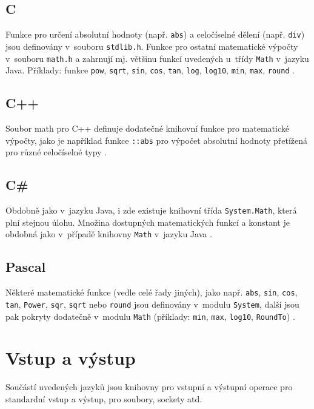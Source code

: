 \documentclass{bakalarka}
\begin{document}
\subsection{C}
Funkce pro určení absolutní hodnoty (např. \texttt{abs}) a celočíselné dělení (např. \texttt{div}) jsou definovány v~souboru \texttt{stdlib.h}. Funkce pro ostatní matematické výpočty v~souboru \texttt{math.h} a zahrnují mj. většinu funkcí uvedených u~třídy \texttt{Math} v~jazyku Java. Příklady: funkce \texttt{pow}, \texttt{sqrt}, \texttt{sin}, \texttt{cos}, \texttt{tan}, \texttt{log}, \texttt{log10}, \texttt{min}, \texttt{max}, \texttt{round} \cite{cpp-guide-cstdlib, cpp-guide-cmath}.

\subsection{C++}
Soubor math pro C++ definuje dodatečné knihovní funkce pro matematické výpočty, jako je například funkce \texttt{::abs} pro výpočet absolutní hodnoty přetížená pro různé celočíselné typy \cite{cpp-guide-cstdlib, cpp-guide-abs}.

\subsection{C\#}
Obdobně jako v~jazyku Java, i zde existuje knihovní třída \texttt{System.Math}, která plní stejnou úlohu. Množina dostupných matematických funkcí a konstant je obdobná jako v~případě knihovny \texttt{Math} v~jazyku Java \cite{cs-guide-math}.

\subsection{Pascal}
Některé matematické funkce (vedle celé řady jiných), jako např. \texttt{abs}, \texttt{sin}, \texttt{cos}, \texttt{tan}, \texttt{Power}, \texttt{sqr}, \texttt{sqrt} nebo \texttt{round} jsou definovány v~modulu \texttt{System}, další jsou pak pokryty dodatečně v~modulu \texttt{Math} (příklady: \texttt{min}, \texttt{max}, \texttt{log10}, \texttt{RoundTo}) \cite{pas-guide-system, pas-guide-math}.

\section{Vstup a výstup}
Součástí uvedených jazyků jsou knihovny pro vstupní a výstupní operace pro standardní vstup a výstup, pro soubory, sockety atd.
\end{document}
